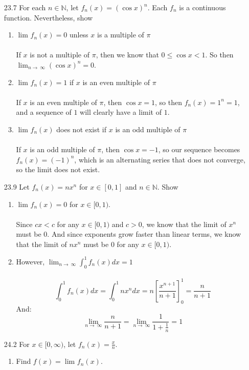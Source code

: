\begin{enumerate}
\begin{enumerate}
    \end{enumerate}
  \item [23.7]
    For each $n \in \mathds{N}$, let $f_n(x) = (\cos x)^n$. Each $f_n$ is a continuous function. Nevertheless, show
    \begin{enumerate}
      \item $\lim_{} f_n(x) = 0$ unless $x$ is a multiple of $\pi$\\\\

        If $x$ is not a multiple of $\pi$, then we know that $0 \leq \cos x < 1$. So then $\lim_{n \to\ \infty} (\cos x)^n = 0$.
      \item $\lim_{} f_n(x) = 1$ if $x$ is an even multiple of $\pi$\\\\

        If $x$ is an even multiple of $\pi$, then $\cos x = 1$, so then $f_n(x) = 1^n = 1$, and a sequence of $1$ will clearly have a limit of $1$.
      \item $\lim_{} f_n(x)$ does not exist if $x$ is an odd multiple of $\pi$\\\\

        If $x$ is an odd multiple of $\pi$, then $\cos x = -1$, so our sequence becomes $f_n(x) = (-1)^n$, which is an alternating series that does not converge, so the limit does not exist.
    \end{enumerate}
  \item [23.9]
    Let $f_n(x) = nx^n$ for $x \in [0,1]$ and $n \in \mathds{N}$. Show
    \begin{enumerate}
      \item $\lim_{} f_n(x) = 0$ for $x \in [0,1)$.\\\\

        Since $cx < c$ for any $x \in [0,1)$ and $c > 0$, we know that the limit of $x^n$ must be $0$. And since exponents grow faster than linear terms, we know that the limit of $nx^n$ must be $0$ for any $x \in [0,1)$.
        
      \item However, $\lim_{n \to\ \infty} \int_{0}^1 f_n(x) dx = 1$\\\\

        $$\int_{0}^1 f_n(x) dx = \int_{0}^1 nx^n dx = n[\frac{x^{n+1}}{n+1}]_{0}^1 = \frac{n}{n+1}$$
        And:
        $$\lim_{n \to\ \infty} \frac{n}{n+1} = \lim_{n \to\ \infty} \frac{1}{1 + \frac{1}{n}} = 1$$
    \end{enumerate}
  \item [24.2]
    For $x \in [0,\infty)$, let $f_n(x) = \frac{x}{n}$.
    \begin{enumerate}
      \item Find $f(x) = \lim_{} f_n(x)$.\\\\


\end{enumerate}
\end{enumerate}
